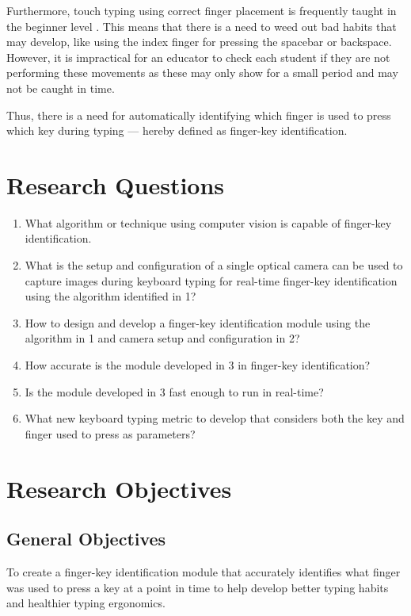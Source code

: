 \documentclass{report}
\begin{document}
Furthermore, touch typing using correct finger placement is frequently taught in
the beginner level \parencite{donica2018}. This means that there is a need to
weed out bad habits that may develop, like using the index finger for pressing
the spacebar or backspace. However, it is impractical for an educator to check
each student if they are not performing these movements as these may only show
for a small period and may not be caught in time.

Thus, there is a need for automatically identifying which finger is used to
press which key during typing --- hereby defined as finger-key identification.

\section{Research Questions}
\begin{enumerate}
	\item What algorithm or technique using computer vision is capable of
	      finger-key identification.
	\item What is the setup and configuration of a single optical camera can be
	      used to capture images during keyboard typing for real-time finger-key
	      identification using the algorithm identified in 1?
	\item How to design and develop a finger-key identification module using
	      the algorithm in 1 and camera setup and configuration in 2?
	\item How accurate is the module developed in 3 in finger-key identification?
	\item Is the module developed in 3 fast enough to run in real-time?
	\item What new keyboard typing metric to develop that considers both the key and
	      finger used to press as parameters?
\end{enumerate}

\section{Research Objectives}

\subsection{General Objectives}
To create a finger-key identification module that accurately identifies what
finger was used to press a key at a point in time to help develop better typing
habits and healthier typing ergonomics.
\end{document}
